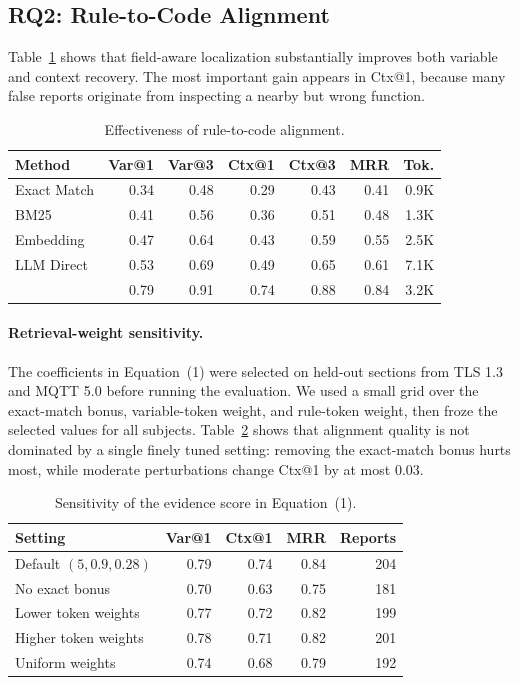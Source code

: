 \subsection{RQ2: Rule-to-Code Alignment}

Table~\ref{tab:alignment} shows that field-aware localization substantially
improves both variable and context recovery. The most important gain appears in
Ctx@1, because many false reports originate from inspecting a nearby but wrong
function.

\begin{table}[t]
\centering
\caption{Effectiveness of rule-to-code alignment.}
\label{tab:alignment}
\scriptsize
\setlength{\tabcolsep}{2.2pt}
\begin{tabular}{lrrrrrr}
\toprule
\textbf{Method} & \textbf{Var@1} & \textbf{Var@3} & \textbf{Ctx@1} & \textbf{Ctx@3} & \textbf{MRR} & \textbf{Tok.} \\
\midrule
Exact Match & 0.34 & 0.48 & 0.29 & 0.43 & 0.41 & 0.9K \\
BM25 & 0.41 & 0.56 & 0.36 & 0.51 & 0.48 & 1.3K \\
Embedding & 0.47 & 0.64 & 0.43 & 0.59 & 0.55 & 2.5K \\
LLM Direct & 0.53 & 0.69 & 0.49 & 0.65 & 0.61 & 7.1K \\
\tool{} & 0.79 & 0.91 & 0.74 & 0.88 & 0.84 & 3.2K \\
\bottomrule
\end{tabular}
\end{table}

\paragraph{Retrieval-weight sensitivity.}
The coefficients in Equation~(1) were selected on held-out sections from TLS
1.3 and MQTT 5.0 before running the evaluation. We used a small grid over
the exact-match bonus, variable-token weight, and rule-token weight, then froze
the selected values for all subjects. Table~\ref{tab:sensitivity} shows that
alignment quality is not dominated by a single finely tuned setting: removing
the exact-match bonus hurts most, while moderate perturbations change Ctx@1 by
at most 0.03.

\begin{table}[t]
\centering
\caption{Sensitivity of the evidence score in Equation~(1).}
\label{tab:sensitivity}
\small
\setlength{\tabcolsep}{4pt}
\begin{tabular}{lrrrr}
\toprule
\textbf{Setting} & \textbf{Var@1} & \textbf{Ctx@1} & \textbf{MRR} & \textbf{Reports} \\
\midrule
Default $(5,0.9,0.28)$ & 0.79 & 0.74 & 0.84 & 204 \\
No exact bonus          & 0.70 & 0.63 & 0.75 & 181 \\
Lower token weights     & 0.77 & 0.72 & 0.82 & 199 \\
Higher token weights    & 0.78 & 0.71 & 0.82 & 201 \\
Uniform weights         & 0.74 & 0.68 & 0.79 & 192 \\
\bottomrule
\end{tabular}
\end{table}

